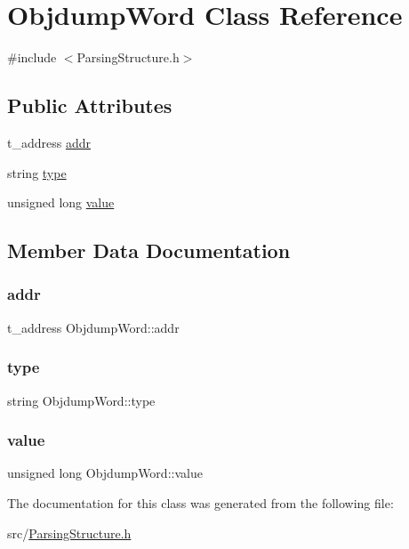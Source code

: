 \hypertarget{classObjdumpWord}{}\section{Objdump\+Word Class Reference}
\label{classObjdumpWord}


{\ttfamily \#include $<$Parsing\+Structure.\+h$>$}

\subsection*{Public Attributes}
\begin{DoxyCompactItemize}
\item 
t\+\_\+address \hyperlink{classObjdumpWord_a8d4d5d9f5a680719718e51925e972ec5}{addr}
\item 
string \hyperlink{classObjdumpWord_ac6760d667bde27a2cbef8094dee19cbe}{type}
\item 
unsigned long \hyperlink{classObjdumpWord_a8e47cb84235c1722e0aa3025237ccb7f}{value}
\end{DoxyCompactItemize}


\subsection{Member Data Documentation}
\mbox{\label{classObjdumpWord_a8d4d5d9f5a680719718e51925e972ec5}} 
\subsubsection{\texorpdfstring{addr}{addr}}
{\footnotesize\ttfamily t\+\_\+address Objdump\+Word\+::addr}

\mbox{\label{classObjdumpWord_ac6760d667bde27a2cbef8094dee19cbe}} 
\subsubsection{\texorpdfstring{type}{type}}
{\footnotesize\ttfamily string Objdump\+Word\+::type}

\mbox{\label{classObjdumpWord_a8e47cb84235c1722e0aa3025237ccb7f}} 
\subsubsection{\texorpdfstring{value}{value}}
{\footnotesize\ttfamily unsigned long Objdump\+Word\+::value}



The documentation for this class was generated from the following file\+:\begin{DoxyCompactItemize}
\item 
src/\hyperlink{ParsingStructure_8h}{Parsing\+Structure.\+h}\end{DoxyCompactItemize}
